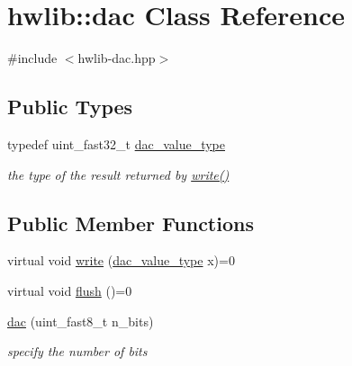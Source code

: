 \hypertarget{classhwlib_1_1dac}{}\section{hwlib\+:\+:dac Class Reference}
\label{classhwlib_1_1dac}


{\ttfamily \#include $<$hwlib-\/dac.\+hpp$>$}

\subsection*{Public Types}
\begin{DoxyCompactItemize}
\item 
\mbox{\label{classhwlib_1_1dac_a817d363b6abcd056bce2f0a4a514cb14}} 
typedef uint\+\_\+fast32\+\_\+t \hyperlink{classhwlib_1_1dac_a817d363b6abcd056bce2f0a4a514cb14}{dac\+\_\+value\+\_\+type}
\begin{DoxyCompactList}\small\item\em the type of the result returned by \hyperlink{classhwlib_1_1dac_ac1572029354d3334b053b4d4966b7208}{write()} \end{DoxyCompactList}\end{DoxyCompactItemize}
\subsection*{Public Member Functions}
\begin{DoxyCompactItemize}
\item 
virtual void \hyperlink{classhwlib_1_1dac_ac1572029354d3334b053b4d4966b7208}{write} (\hyperlink{classhwlib_1_1dac_a817d363b6abcd056bce2f0a4a514cb14}{dac\+\_\+value\+\_\+type} x)=0
\item 
virtual void \hyperlink{classhwlib_1_1dac_ab25a6ae2d86b0bec3afdecf3d22faf67}{flush} ()=0
\item 
\mbox{\label{classhwlib_1_1dac_ab07c4b69fb42aa080d94714bc06f0ab9}} 
\hyperlink{classhwlib_1_1dac_ab07c4b69fb42aa080d94714bc06f0ab9}{dac} (uint\+\_\+fast8\+\_\+t n\+\_\+bits)
\begin{DoxyCompactList}\small\item\em specify the number of bits \end{DoxyCompactList}\end{DoxyCompactItemize}
